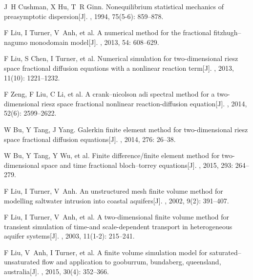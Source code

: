 \documentclass[twoside,UTF8]{nputhesis}
\begin{document}
\begin{thebibliography}{99}
	J~H Cushman, X Hu, T~R Ginn.
	\newblock Nonequilibrium statistical mechanics of preasymptotic dispersion[J].
	, 1994, 75(5-6): 859--878.
	
	F Liu, I Turner, V~Anh, et al.
	\newblock A numerical method for the fractional fitzhugh--nagumo monodomain
	model[J].
	, 2013, 54: 608--629.
	
	F Liu, S Chen, I Turner, et al.
	\newblock Numerical simulation for two-dimensional riesz space fractional
	diffusion equations with a nonlinear reaction term[J].
	, 2013, 11(10): 1221--1232.
	
	F Zeng, F Liu, C Li, et al.
	\newblock A crank--nicolson adi spectral method for a two-dimensional riesz
	space fractional nonlinear reaction-diffusion equation[J].
	, 2014, 52(6): 2599--2622.
	
	W Bu, Y Tang, J Yang.
	\newblock Galerkin finite element method for two-dimensional riesz space
	fractional diffusion equations[J].
	, 2014, 276: 26--38.
	
	W Bu, Y Tang, Y Wu, et al.
	\newblock Finite difference/finite element method for two-dimensional space and
	time fractional bloch--torrey equations[J].
	, 2015, 293: 264--279.
	
	F Liu, I Turner, V~Anh.
	\newblock An unstructured mesh finite volume method for modelling saltwater
	intrusion into coastal aquifers[J].
	, 2002, 9(2): 391--407.
	
	F Liu, I Turner, V~Anh, et al.
	\newblock A two-dimensional finite volume method for transient simulation of
	time-and scale-dependent transport in heterogeneous aquifer systems[J].
	, 2003, 11(1-2): 215--241.
	
	F Liu, V~Anh, I Turner, et al.
	\newblock A finite volume simulation model for saturated–unsaturated flow and
	application to gooburrum, bundaberg, queensland, australia[J].
	, 2015, 30(4): 352--366.
	

\end{thebibliography}
\end{document}
